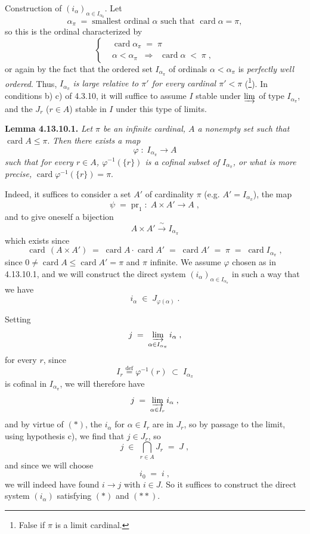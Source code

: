 \documentclass[11pt]{article}
\newcommand{\printedpage}[1]{\marginpar{\footnotesize p.~#1}}
\newcommand{\msp}[1]{\marginpar{\footnotesize [#1]}}
\newcommand{\card}{\operatorname{card}}
\begin{document}
Construction of $(i_\alpha)_{\alpha\in I_{\alpha_0}}$. Let %
\[ \alpha_\pi \; = \; \text{smallest ordinal } \alpha \text{ such that } \card\alpha=\pi, \tag*{(1)} \]
so this is the ordinal characterized by
\[ \left\{
\begin{aligned}
&\card\alpha_\pi \; = \; \pi \\
&\alpha<\alpha_\pi \;\; \Longrightarrow \;\; \card\alpha \; < \; \pi \; ,
\end{aligned}
\right. \tag*{(2)} \]
or again by the fact that the ordered set $I_{\alpha_\pi}$ of ordinals $\alpha<\alpha_\pi$ is \textit{perfectly well ordered}. Thus, $I_{\alpha_\pi}$ \textit{is large relative to $\pi'$ for every cardinal $\pi'<\pi$} (\footnote[130]{False if $\pi$ is a limit cardinal.}). In conditions b) c) of 4.3.10, it will suffice to assume $I$ stable under $\varinjlim$ of type $I_{\alpha_\pi}$, and the $J_r$ ($r\in A$) stable in $I$ under this type of limits. %

\textbf{Lemma 4.13.10.1.} \textit{Let $\pi$ be an infinite cardinal, $A$ a nonempty set such that} $\card A\leqslant\pi$. \textit{Then}
\msp{page 299}
\textit{there exists a map}
\[ \varphi \; : \; I_{\alpha_\pi} \longrightarrow A \]
\textit{such that for every $r\in A$, $\varphi^{-1}(\{r\})$ is a cofinal subset of $I_{\alpha_\pi}$, or what is more precise,} $\card\varphi^{-1}(\{r\})=\pi$. %

Indeed, it suffices to consider a set $A'$ of cardinality $\pi$ (e.g. $A'=I_{\alpha_\pi}$), the map
\[ \psi \; = \; \mathrm{pr}_1 \; : \; A\times A'\longrightarrow A \; , \]
and to give oneself a bijection
\[ A\times A' \xrightarrow{\ \sim\ } I_{\alpha_\pi} \]
which exists since
\[ \card\,(A\times A') \; = \; \card A\cdot\card A' \; = \; \card A' \; = \; \pi \; = \; \card I_{\alpha_\pi} \; , \]
since $0\neq\card A\leqslant\card A'=\pi$ and $\pi$ infinite. We assume $\varphi$ chosen as in 4.13.10.1, and we will construct the direct system $(i_\alpha)_{\alpha\in I_{\alpha_\pi}}$ in such a way that we have
\[ i_\alpha \; \in \; J_{\varphi(\alpha)} \; . \]

Setting
\[ j \; = \; \varinjlim_{\alpha\in I_{\alpha_\pi}} i_\alpha \; , \]
\printedpage{112}
\msp{page 300}
for every $r$, since
\[ I_r \overset{\text{def}}{=} \varphi^{-1}(r) \; \subset \; I_{\alpha_\pi} \]
is cofinal in $I_{\alpha_\pi}$, we will therefore have
\[ j \; = \; \varinjlim_{\alpha\in I_r} i_\alpha \; , \]
and by virtue of $(*)$, the $i_\alpha$ for $\alpha\in I_r$ are in $J_r$, so by passage to the limit, using hypothesis c), we find that $j\in J_r$, so
\[ j \; \in \; \bigcap_{r\in A} J_r \; = \; J \; , \]
and since we will choose
\[ i_0 \; = \; i \; , \tag*{$(**)$} \]
we will indeed have found $i\longrightarrow j$ with $i\in J$. So it suffices to construct the direct system $(i_\alpha)$ satisfying $(*)$ and $(**)$. %
\end{document}
